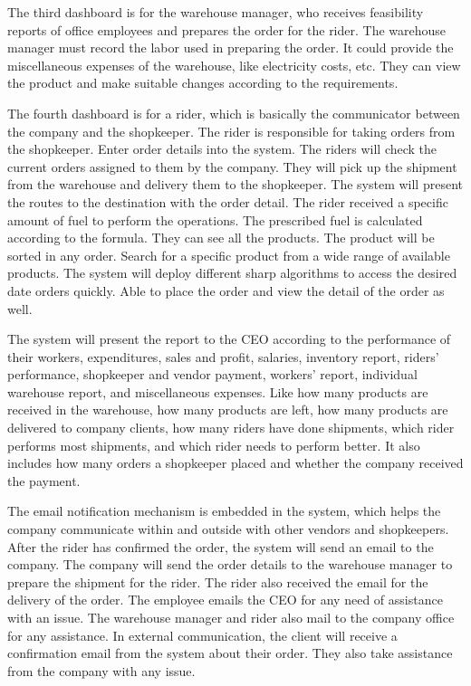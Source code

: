 \documentclass[12pt,a4paper]{report}
\begin{document}
The third dashboard is for the warehouse manager, who receives feasibility reports of office employees and prepares the order for the rider. The warehouse manager must record the labor used in preparing the order. It could provide the miscellaneous expenses of the warehouse, like electricity costs, etc. They can view the product and make suitable changes according to the requirements.
 
The fourth dashboard is for a rider, which is basically the communicator between the company and the shopkeeper.
The rider is responsible for taking orders from the shopkeeper. 
Enter order details into the system. 
The riders will check the current orders assigned to them by the company. They will pick up the shipment from the warehouse and delivery them to the shopkeeper. The system will present the routes to the destination with the order detail. The rider received a specific amount of fuel to perform the operations. The prescribed fuel is calculated according to the formula. They can see all the products. The product will be sorted in any order. Search for a specific product from a wide range of available products. The system will deploy different sharp algorithms to access the desired date orders quickly. Able to place the order and view the detail of the order as well. 
 
The system will present the report to the CEO according to the performance of their workers, expenditures, sales and profit, salaries, inventory report, riders' performance, shopkeeper and vendor payment, workers' report, individual warehouse report, and miscellaneous expenses.
Like how many products are received in the warehouse, how many products are left, how many products are delivered to company clients, how many riders have done shipments, which rider performs most shipments, and which rider needs to perform better. It also includes how many orders a shopkeeper placed and whether the company received the payment. 
 
The email notification mechanism is embedded in the system, which helps the company communicate within and outside with other vendors and shopkeepers. After the rider has confirmed the order, the system will send an email to the company. The company will send the order details to the warehouse manager to prepare the shipment for the rider. The rider also received the email for the delivery of the order. The employee emails the CEO for any need of assistance with an issue. The warehouse manager and rider also mail to the company office for any assistance. In external communication, the client will receive a confirmation email from the system about their order. They also take assistance from the company with any issue. 
 
\end{document}
